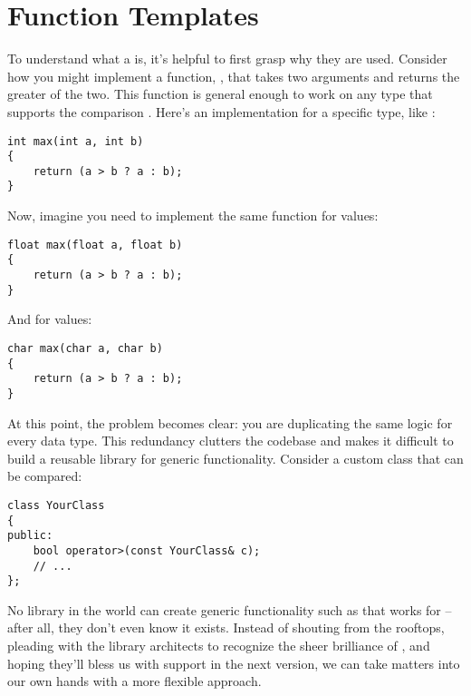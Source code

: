 \section{Function Templates}

\noindent
To understand what a  is, it's helpful to first grasp why they are used.
Consider how you might implement a function, , that takes two arguments and returns the greater of the two.
This function is general enough to work on any type that supports the comparison .
Here's an implementation for a specific type, like :

\begin{lstlisting}[style=cxx]
int max(int a, int b)
{
    return (a > b ? a : b);
}
\end{lstlisting}

\noindent
Now, imagine you need to implement the same  function for  values:

\begin{lstlisting}[style=cxx]
float max(float a, float b)
{
    return (a > b ? a : b);
}
\end{lstlisting}

\noindent
And for  values:

\begin{lstlisting}[style=cxx]
char max(char a, char b)
{
    return (a > b ? a : b);
}
\end{lstlisting}

\noindent
At this point, the problem becomes clear: you are duplicating the same logic for every data type.
This redundancy clutters the codebase and makes it difficult to build a reusable library for generic functionality.
Consider a custom class that can be compared:

\begin{lstlisting}[style=cxx]
class YourClass
{
public:
    bool operator>(const YourClass& c);
    // ...
};
\end{lstlisting}

\noindent
No library in the world can create generic functionality such as  that works for --after all, they don't even know it exists.
Instead of shouting from the rooftops, pleading with the library architects to recognize the sheer brilliance of , and hoping they'll bless us with support in the next version, we can take matters into our own hands with a more flexible approach.

